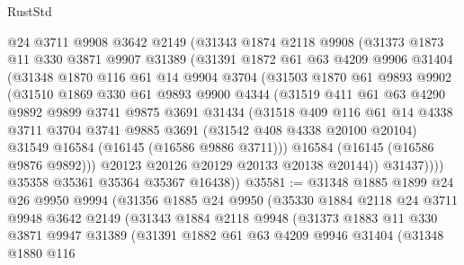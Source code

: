 \begin{lexlean}{RustStd}
\begin{coremodule}
        @24
        @3711
        @9908
        @3642
        @2149
        (@31343
          @1874
          @2118
          @9908
          (@31373
            @1873
            @11
            @330
            @3871
            @9907
            @31389
            (@31391
              @1872
              @61
              @63
              @4209
              @9906
              @31404
              (@31348
                @1870
                @116
                @61
                @14
                @9904
                @3704
                (@31503
                  @1870
                  @61
                  @9893
                  @9902
                  (@31510
                    @1869
                    @330
                    @61
                    @9893
                    @9900
                    @4344
                    (@31519
                      @411
                      @61
                      @63
                      @4290
                      @9892
                      @9899
                      @3741
                      @9875
                      @3691
                      @31434
                      (@31518
                        @409
                        @116
                        @61
                        @14
                        @4338
                        @3711
                        @3704
                        @3741
                        @9885
                        @3691
                        (@31542 @408 @4338 @20100 @20104)
                        @31549
                        @16584
                        (@16145 (@16586 @9886 @3711)))
                      @16584
                      (@16145 (@16586 @9876 @9892)))
                    @20123
                    @20126
                    @20129
                    @20133
                    @20138
                    @20144))
                @31437))))
        @35358
        @35361
        @35364
        @35367
        @16438))
@35581 := @31348
    @1885
    @1899
    @24
    @26
    @9950
    @9994
    (@31356
      @1885
      @24
      @9950
      (@35330
        @1884
        @2118
        @24
        @3711
        @9948
        @3642
        @2149
        (@31343
          @1884
          @2118
          @9948
          (@31373
            @1883
            @11
            @330
            @3871
            @9947
            @31389
            (@31391
              @1882
              @61
              @63
              @4209
              @9946
              @31404
              (@31348
                @1880
                @116

\end{coremodule}
\end{lexlean}
